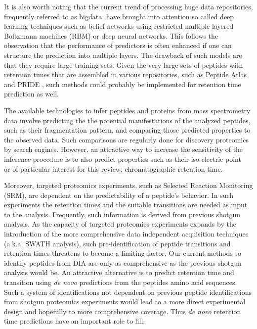\documentclass[a4paper]{article}
\begin{document}
It is also worth noting that the current trend of processing huge data
repositories, frequently referred to as bigdata, have brought into
attention so called deep learning techniques such as belief networks
using restricted multiple layered Boltzmann machines (RBM)
\cite{salakhutdinov2009deep} or deep neural networks. This follows the
observation that the performance of predictors is often enhanced if
one can structure the prediction into multiple layers. The drawback of
such models are that they require large training sets. Given the very
large sets of peptides with retention times that are assembled in
various repositories, such as Peptide Atlas
\cite{desiere2006peptideatlas} and PRIDE \cite{martens2005pride}, such
methods could probably be implemented for retention time prediction as
well.

The available technologies to infer peptides and proteins from mass
spectrometry data involve predicting the the potential manifestations
of the analyzed peptides, such as their fragmentation pattern, and
comparing those predicted properties to the observed data. Such
comparisons are regularly done for discovery proteomics by search
engines. However, an attractive way to increase the sensitivity of the
inference procedure is to also predict properties such as their
iso-electric point~\cite{branca2014hirief} or of particular interest
for this review, chromatographic retention
time\cite{cerqueira2010mude}. 

Moreover, targeted proteomics experiments, such as Selected Reaction
Monitoring (SRM), are dependent on the predictability of a
peptide's behavior. In such experiments the retention times and the
suitable transitions are needed as input to the analysis. Frequently,
such information is derived from previous shotgun analysis. As the
capacity of targeted proteomics experiments expands by the
introduction of the more comprehensive data independent acquisition
techniques \cite{Venable2004} (a.k.a. SWATH analysis), such
pre-identification of peptide transitions and retention times
threatens to become a limiting factor. Our current methods to identify
peptides from DIA are only as comprehensive as the previous shotgun
analysis would be. An attractive alternative is to predict retention
time and transition using {\em de novo} predictions from the peptides
amino acid sequences.  Such a system of identifications not dependent
on previous peptide identifications from shotgun proteomics experiments
would lead to a more direct experimental design and hopefully to more
comprehensive coverage. Thus {\em de novo} retention time predictions
have an important role to fill.




\end{document}
